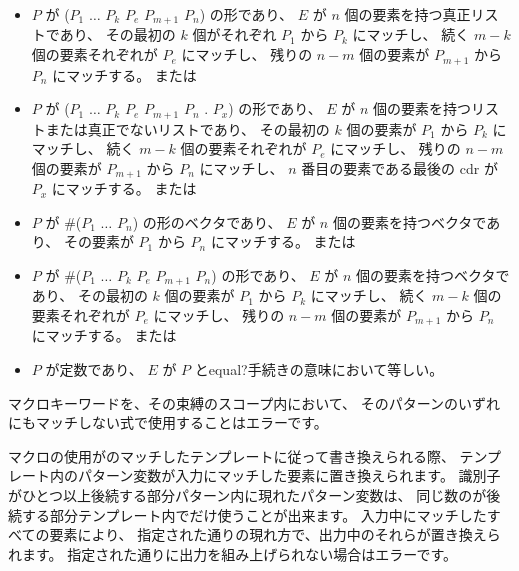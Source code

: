 \begin{entry}
\begin{itemize}
\item $P$ が
      {\cf ($P_1$ $\dots$ $P_k$ $P_e$  $P_{m+1}$ \dotsfoo{} $P_n$)}
      の形であり、
      $E$ が $n$ 個の要素を持つ真正リストであり、
      その最初の $k$ 個がそれぞれ $P_1$ から $P_k$ にマッチし、
      続く $m-k$ 個の要素それぞれが $P_e$ にマッチし、
      残りの $n-m$ 個の要素が $P_{m+1}$ から $P_n$ にマッチする。
      または

\item $P$ が
      {\cf ($P_1$ $\dots$ $P_k$ $P_{e}$  $P_{m+1}$ \dotsfoo{} $P_n$ . $P_x$)}
      の形であり、
      $E$ が $n$ 個の要素を持つリストまたは真正でないリストであり、
      その最初の $k$ 個の要素が $P_1$ から $P_k$ にマッチし、
      続く $m-k$ 個の要素それぞれが $P_e$ にマッチし、
      残りの $n-m$ 個の要素が $P_{m+1}$ から $P_n$ にマッチし、
      $n$ 番目の要素である最後の cdr が $P_x$ にマッチする。
      または

\item $P$ が {\cf \#($P_1$ $\dots$ $P_n$)} の形のベクタであり、
      $E$ が $n$ 個の要素を持つベクタであり、
      その要素が $P_1$ から $P_n$ にマッチする。
      または

\item $P$ が
      {\cf \#($P_1$ $\dots$ $P_k$ $P_{e}$  $P_{m+1}$ \dotsfoo $P_n$)}
      の形であり、
      $E$ が $n$ 個の要素を持つベクタであり、
      その最初の $k$ 個の要素が $P_1$ から $P_k$ にマッチし、
      続く $m-k$ 個の要素それぞれが $P_e$ にマッチし、
      残りの $n-m$ 個の要素が $P_{m+1}$ から $P_n$ にマッチする。
      または

\item $P$ が定数であり、 $E$ が $P$ と{\cf equal?}手続きの意味において等しい。
\end{itemize}

マクロキーワードを、その束縛のスコープ内において、
そのパターンのいずれにもマッチしない式で使用することはエラーです。

マクロの使用がのマッチしたテンプレートに従って書き換えられる際、
テンプレート内のパターン変数が入力にマッチした要素に置き換えられます。
識別子がひとつ以上後続する部分パターン内に現れたパターン変数は、
同じ数のが後続する部分テンプレート内でだけ使うことが出来ます。
入力中にマッチしたすべての要素により、
指定された通りの現れ方で、出力中のそれらが置き換えられます。
指定された通りに出力を組み上げられない場合はエラーです。



\end{entry}
